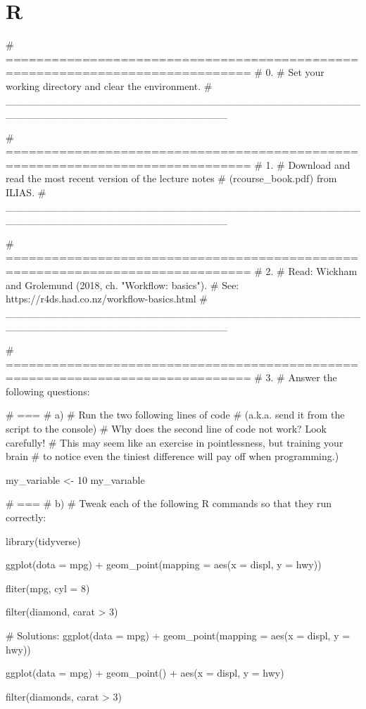 


\section{R}



\begin{rblock1}
# ==============================================================================
# 0. 
# Set your working directory and clear the environment.
# ______________________________________________________________________________


# ==============================================================================
# 1. 
# Download and read the most recent version of the lecture notes 
# (rcourse_book.pdf) from ILIAS.
# ______________________________________________________________________________


# ==============================================================================
# 2. 
# Read: Wickham and Grolemund (2018, ch. "Workflow: basics"). 
# See: https://r4ds.had.co.nz/workflow-basics.html 
# ______________________________________________________________________________


# ==============================================================================
# 3. 
# Answer the following questions:

# ===
# a) 
# Run the two following lines of code 
# (a.k.a. send it from the script to the console)
# Why does the second line of code not work? Look carefully! 
# This may seem like an exercise in pointlessness, but training your brain
# to notice even the tiniest difference will pay off when programming.)

my_variable <- 10
my_varıable

# ===
# b)
# Tweak each of the following R commands so that they run correctly:

library(tidyverse)

ggplot(dota = mpg) +
geom_point(mapping = aes(x = displ, y = hwy))

fliter(mpg, cyl = 8)

filter(diamond, carat > 3)

# Solutions:
ggplot(data = mpg) +
geom_point(mapping = aes(x = displ, y = hwy))

ggplot(data = mpg) + 
geom_point() +
aes(x = displ, y = hwy)

filter(diamonds, carat > 3)


\end{rblock1}
